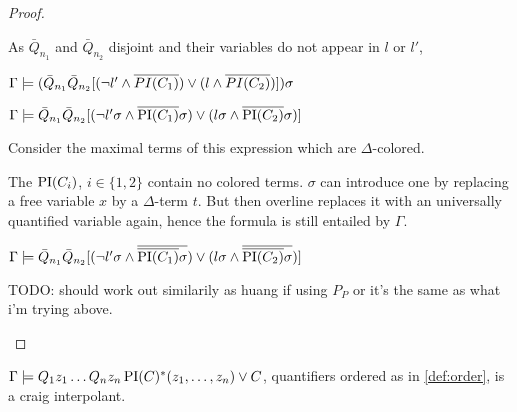 \documentclass[,%
	paper=a4,%
	DIV14, 
	liststotoc,
	bibtotoc,
	draft=false,%
	numbers=noendperiod
]{scrartcl}
\begin{document}
\begin{proof}
\begin{enumerate}
						As $\bar Q_{n_1}$ and $\bar Q_{n_2}$ disjoint and their variables do not appear in $l$ or $l'$,

						$\Gamma \models (\bar Q_{n_1} \bar Q_{n_2} [ (\lnot l' \land  \overline{PI(C_1)}) \lor (l \land \overline{PI(C_2)}) ] ) \sigma$

						$\Gamma \models \bar Q_{n_1} \bar Q_{n_2} [ (\lnot l'\sigma \land  \overline{\operatorname{PI}(C_1)}\sigma) \lor (l\sigma \land \overline{\operatorname{PI}(C_2)}\sigma) ] $

						Consider the maximal terms of this expression which are $\Delta$-colored.

						The $\operatorname{PI}(C_i)$, $i \in \{1,2\}$ contain no colored terms. $\sigma$ can introduce one by replacing a free variable $x$ by a $\Delta$-term $t$. But then overline replaces it with an universally quantified variable again, hence the formula is still entailed by $\Gamma$.

						$\Gamma \models \bar Q_{n_1} \bar Q_{n_2} [ (\lnot l'\sigma \land  \overline{\overline{\operatorname{PI}(C_1)}\sigma}) \lor (l\sigma \land \overline{\overline{\operatorname{PI}(C_2)}\sigma}) ] $



						TODO: should work out similarily as huang if using $P_P$ or it's the same as what i'm trying above.

				\end{enumerate}
				\end{proof}



\begin{prop}
	$\Gamma \models Q_1 z_1 \ldots Q_n z_n \operatorname{PI}(C)^*(z_1, \ldots, z_n)  \lor C$, quantifiers ordered as in \ref{def:order}, is a craig interpolant.
\end{prop}
\end{document}
